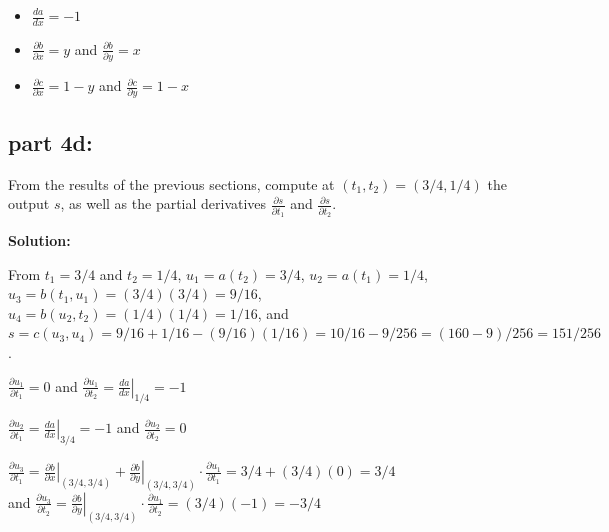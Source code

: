 \documentclass{article}
\newcommand{\at}[1]{\left. #1 \right|}
\newcommand{\diff}[2]{\frac{d #1}{d #2}}
\newcommand{\partdiff}[2]{\frac{\partial #1}{\partial #2}}
\newcommand{\dr}[1]{\textcolor{dark_red}{#1}}
\begin{document}
\dr{\begin{itemize}
\item \(\frac{da}{dx} = -1\)
\item \(\frac{\partial b}{\partial x} = y\) and \(\frac{\partial b}{\partial y} = x\)
\item \(\frac{\partial c}{\partial x} = 1 - y\) and \(\frac{\partial c}{\partial y} = 1 - x\)
\end{itemize}}

\vspace{0.5cm}



\subsection*{part 4d:}

From the results of the previous sections, compute at \((t_1, t_2) = (3/4, 1/4)\) the output \(s\), as well as the partial derivatives \(\frac{\partial s}{\partial t_1}\) and \(\frac{\partial s}{\partial t_2}\).

\vspace{0.5cm}

\dr{\bf Solution:}

\vspace{0.5cm}

\dr{From \(t_1 = 3/4\) and \(t_2 = 1/4\), \(u_1 = a(t_2) = 3/4\), \(u_2 = a(t_1) = 1/4\), \(u_3 = b(t_1,u_1) = (3/4)(3/4) = 9/16\), \(u_4 = b(u_2,t_2) = (1/4)(1/4) = 1/16\), and \(s = c(u_3,u_4) = 9/16 + 1/16 - (9/16)(1/16) = 10/16 - 9/256 = (160 - 9)/256 = 151/256\).}

\vspace{0.4cm}

\dr{\(\partdiff{u_1}{t_1} = 0\) and \(\partdiff{u_1}{t_2} = \at{\diff{a}{x}}_{1/4} = -1\)}

\vspace{0.4cm}

\dr{\(\partdiff{u_2}{t_1} = \at{\diff{a}{x}}_{3/4} = -1\) and \(\partdiff{u_2}{t_2} = 0\)}

\vspace{0.4cm}

\dr{\(\partdiff{u_3}{t_1} = \at{\partdiff{b}{x}}_{(3/4,3/4)} + \at{\partdiff{b}{y}}_{(3/4,3/4)}\cdot\partdiff{u_1}{t_1} = 3/4 + (3/4)(0) = 3/4\) \\ and 
\(\partdiff{u_3}{t_2} = \at{\frac{\partial b}{\partial y}}_{(3/4,3/4)}\cdot\frac{\partial u_1}{\partial t_2} = (3/4)(-1) = -3/4\)}
\end{document}

